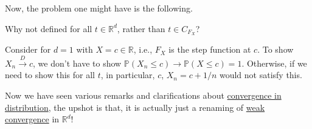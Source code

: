 Now, the problem one might have is the following.

\begin{problem*}
	Why not defined for all \(t \in \mathbb{R} ^d\), rather than \(t \in C_{F_X}\)?
\end{problem*}
\begin{answer}
	Consider for \(d = 1\) with \(X = c \in \mathbb{R} \), i.e., \(F_X\) is the step function at \(c\). To show \(X_n \overset{D}{\to } c\), we don't have to show \(\mathbb{P} (X_n \leq c) \to \mathbb{P} (X \leq c) = 1\). Otherwise, if we need to show this for all \(t\), in particular, \(c\), \(X_n = c + 1 / n\) would not satisfy this.
\end{answer}

Now we have seen various remarks and clarifications about \hyperref[def:converge-in-distribution]{convergence in distribution}, the upshot is that, it is actually just a renaming of \hyperref[def:weak-convergence]{weak convergence} in \(\mathbb{R} ^d\)!

